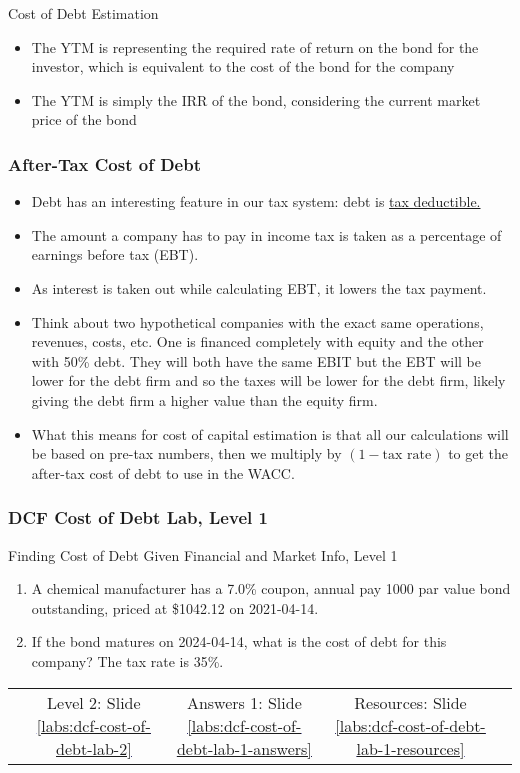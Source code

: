 \documentclass[handout, 11pt]{beamer}
\begin{document}
\begin{section}[Debt]{Cost of Debt Estimation}
\begin{frame}
\begin{itemize}
\vfill
\item The YTM is representing the required rate of return on the bond for the investor, which is equivalent to the cost of the bond for the company
\vfill
\item The YTM is simply the IRR of the bond, considering the current market price of the bond
\end{itemize}
\end{frame}
\begin{frame}
\frametitle{After-Tax Cost of Debt}
\begin{itemize}
\small
\vfill
\item Debt has an interesting feature in our tax system: debt is
\underline{tax deductible.}
\vfill
\item The amount a company has to pay in income tax is taken as a percentage of earnings before tax (EBT).
\vfill
\item As interest is taken out while calculating EBT, it lowers the tax payment.
\vfill
\item Think about two hypothetical companies with the exact same operations, revenues, costs, etc. One is financed completely with equity and the other with 50\% debt. They will both have the same EBIT but the EBT will be lower for the debt firm and so the taxes will be lower for the debt firm, likely giving the debt firm a higher value than the equity firm.
\vfill
\item What this means for cost of capital estimation is that all our calculations will be based on pre-tax numbers, then we multiply by $(1 - \text{tax rate})$ to get the after-tax cost of debt to use in the WACC.
\end{itemize}
\end{frame}
\begin{frame}
\frametitle{DCF Cost of Debt Lab, Level 1}
{
\begin{block}{Finding Cost of Debt Given Financial and Market Info, Level 1}
\begin{enumerate}
\item A chemical manufacturer has a 7.0\% coupon, annual pay 1000 par value bond outstanding, priced at \$1042.12 on 2021-04-14.
\item If the bond matures on 2024-04-14, what is the cost of debt for this company? The tax rate is 35\%.
\end{enumerate}
\vfill
\begin{tabular*}{\textwidth}{@{\extracolsep{\fill}}ccccc}
\toprule
\hfill & Level 2: Slide \textcolor{blue}{\underline{\ref{labs:dcf-cost-of-debt-lab-2}}} & Answers 1: Slide \textcolor{blue}{\underline{\ref{labs:dcf-cost-of-debt-lab-1-answers}}} & Resources: Slide \textcolor{blue}{\underline{\ref{labs:dcf-cost-of-debt-lab-1-resources}}} & \hfill\\


\end{tabular*}
\end{block}}
\end{frame}
\end{section}
\end{document}
